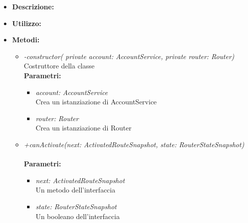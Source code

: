 \begin{itemize}
	\item \textbf{Descrizione:}\\
	
	\item \textbf{Utilizzo:}\\
	
	\item \textbf{Metodi:}
		\begin{itemize}
			\item \emph{-constructor( private account: AccountService, private router: Router)}\\
    		Costruttore della classe\\
    		\textbf{Parametri:}
    		\begin{itemize}
    			\item \emph{account: AccountService}\\
    			Crea un istanziazione di AccountService
    			\item \emph{router: Router}\\
    			Crea un istanziazione di Router
    		\end{itemize}
    		\item \emph{+canActivate(next: ActivatedRouteSnapshot, state: RouterStateSnapshot)}\\
    		\\
    		\textbf{Parametri:}
    		\begin{itemize}
    			\item \emph{next: ActivatedRouteSnapshot}\\
    			Un metodo dell'interfaccia
    			\item \emph{state: RouterStateSnapshot}\\
    			Un booleano dell'interfaccia
    		\end{itemize}
		\end{itemize}
\end{itemize}